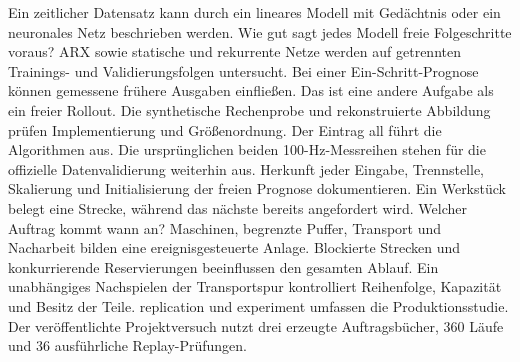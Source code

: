 Ein zeitlicher Datensatz kann durch ein lineares Modell mit Gedächtnis oder ein neuronales Netz beschrieben werden. Wie gut sagt jedes Modell freie Folgeschritte voraus?
ARX sowie statische und rekurrente Netze werden auf getrennten Trainings- und Validierungsfolgen untersucht.
Bei einer Ein-Schritt-Prognose können gemessene frühere Ausgaben einfließen. Das ist eine andere Aufgabe als ein freier Rollout.
Die synthetische Rechenprobe und rekonstruierte Abbildung prüfen Implementierung und Größenordnung.
Der Eintrag all führt die Algorithmen aus. Die ursprünglichen beiden 100-Hz-Messreihen stehen für die offizielle Datenvalidierung weiterhin aus.
Herkunft jeder Eingabe, Trennstelle, Skalierung und Initialisierung der freien Prognose dokumentieren.
Ein Werkstück belegt eine Strecke, während das nächste bereits angefordert wird. Welcher Auftrag kommt wann an?
Maschinen, begrenzte Puffer, Transport und Nacharbeit bilden eine ereignisgesteuerte Anlage.
Blockierte Strecken und konkurrierende Reservierungen beeinflussen den gesamten Ablauf.
Ein unabhängiges Nachspielen der Transportspur kontrolliert Reihenfolge, Kapazität und Besitz der Teile.
replication und experiment umfassen die Produktionsstudie. Der veröffentlichte Projektversuch nutzt drei erzeugte Auftragsbücher, 360 Läufe und 36 ausführliche Replay-Prüfungen.
